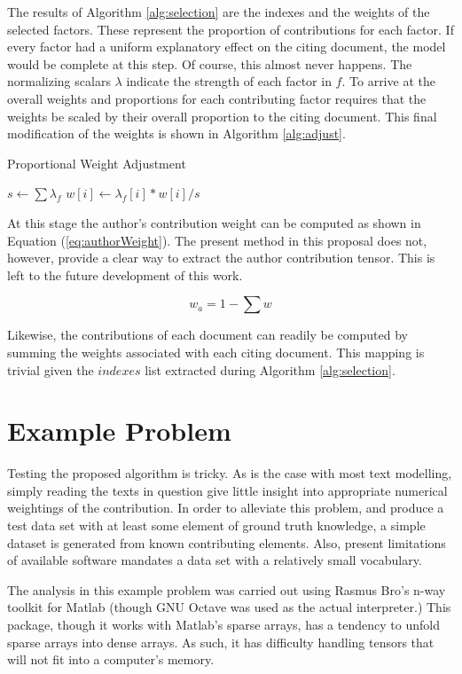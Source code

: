 \documentclass{article}
\begin{document}
The results of Algorithm \ref{alg:selection} are the
indexes and the weights of the selected factors.  These represent the
proportion of contributions for each factor.  If every factor had
a uniform explanatory effect on the citing document, the model would
be complete at this step.  Of course, this almost never happens.  The
normalizing scalars $\lambda$ indicate the strength of each factor in
$f$.  To arrive at the overall weights and proportions for each
contributing factor requires that the weights be scaled by their
overall proportion to the citing document.  This final modification of
the weights is shown in Algorithm \ref{alg:adjust}.

\begin{algorithm}
    \caption{Proportional Weight Adjustment}
    \label{alg:adjust}
    $s \leftarrow \sum \lambda_f$\;
     {
        $w[i] \leftarrow \lambda_f[i] * w[i] / s$\;
    }
\end{algorithm}

At this stage the author's contribution weight can be computed as
shown in Equation (\ref{eq:authorWeight}).  The present method in this
proposal does not, however, provide a clear way to extract the author
contribution tensor.  This is left to the future development of this
work.

\begin{equation}
    \label{eq:authorWeight}
    w_a = 1 - \sum w
\end{equation}

Likewise, the contributions of each document can readily be computed
by summing the weights associated with each citing document.  This
mapping is trivial given the $indexes$ list extracted during Algorithm
\ref{alg:selection}. 

\section{Example Problem}
Testing the proposed algorithm is tricky.  As is the case with most
text modelling, simply reading the texts in question give little
insight into appropriate numerical weightings of the contribution.  In
order to alleviate this problem, and produce a test data set with at
least some element of ground truth knowledge, a simple dataset is
generated from known contributing elements.  Also, present limitations
of available software mandates a data set with a relatively small
vocabulary.

The analysis in this example problem was carried out using Rasmus
Bro's n-way toolkit \cite{andersson2000} for Matlab (though GNU Octave was used as the
actual interpreter.)  This package, though it works with Matlab's
sparse arrays, has a tendency to unfold sparse arrays into dense
arrays.  As such, it has difficulty handling tensors that will not fit
into a computer's memory.  
\end{document}

